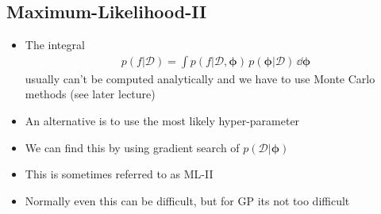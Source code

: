 \begin{slide}
\section[-2]{Maximum-Likelihood-II}

\begin{PauseHighLight}
  \begin{itemize}
  \item The integral
    \begin{align*}
      p(f|\mathcal{D}) = \int
      p(f|\mathcal{D},\bm{\phi}) \, p(\bm{\phi} | \mathcal{D}) \,
      \dd \bm{\phi}
    \end{align*}
    usually can't be computed analytically and we
    have to use Monte Carlo methods (see later lecture)\pause
  \item An alternative is to use the most likely hyper-parameter\pause
  \item We can find this by using gradient search of
    $p(\mathcal{D}|\bm{\phi})$\pause
  \item This is sometimes referred to as ML-II\pause
  \item Normally even this can be difficult, but for GP its not too
    difficult\pause
  \end{itemize}
\end{PauseHighLight}


\end{slide}


